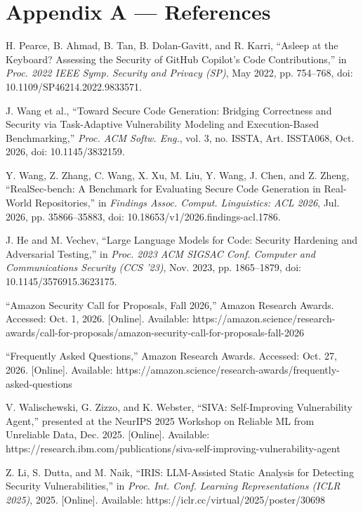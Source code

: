 \documentclass[11pt]{article}
\begin{document}
\section*{Appendix A --- References}
\begin{enumerate}[leftmargin=2.2em, itemsep=0.3ex, topsep=2pt, label={[\arabic*]}]
\item H. Pearce, B. Ahmad, B. Tan, B. Dolan-Gavitt, and R. Karri, ``Asleep at the Keyboard? Assessing the Security of GitHub Copilot's Code Contributions,'' in \emph{Proc. 2022 IEEE Symp. Security and Privacy (SP)}, May 2022, pp. 754--768, doi: 10.1109/SP46214.2022.9833571.
\item J. Wang et al., ``Toward Secure Code Generation: Bridging Correctness and Security via Task-Adaptive Vulnerability Modeling and Execution-Based Benchmarking,'' \emph{Proc. ACM Softw. Eng.}, vol. 3, no. ISSTA, Art. ISSTA068, Oct. 2026, doi: 10.1145/3832159.
\item Y. Wang, Z. Zhang, C. Wang, X. Xu, M. Liu, Y. Wang, J. Chen, and Z. Zheng, ``RealSec-bench: A Benchmark for Evaluating Secure Code Generation in Real-World Repositories,'' in \emph{Findings Assoc. Comput. Linguistics: ACL 2026}, Jul. 2026, pp. 35866--35883, doi: 10.18653/v1/2026.findings-acl.1786.
\item J. He and M. Vechev, ``Large Language Models for Code: Security Hardening and Adversarial Testing,'' in \emph{Proc. 2023 ACM SIGSAC Conf. Computer and Communications Security (CCS '23)}, Nov. 2023, pp. 1865--1879, doi: 10.1145/3576915.3623175.
\item ``Amazon Security Call for Proposals, Fall 2026,'' Amazon Research Awards. Accessed: Oct. 1, 2026. [Online]. Available: https://amazon.science/research-awards/call-for-proposals/amazon-security-call-for-proposals-fall-2026
\item ``Frequently Asked Questions,'' Amazon Research Awards. Accessed: Oct. 27, 2026. [Online]. Available: https://amazon.science/research-awards/frequently-asked-questions
\item V. Walischewski, G. Zizzo, and K. Webster, ``SIVA: Self-Improving Vulnerability Agent,'' presented at the NeurIPS 2025 Workshop on Reliable ML from Unreliable Data, Dec. 2025. [Online]. Available: https://research.ibm.com/publications/siva-self-improving-vulnerability-agent
\item Z. Li, S. Dutta, and M. Naik, ``IRIS: LLM-Assisted Static Analysis for Detecting Security Vulnerabilities,'' in \emph{Proc. Int. Conf. Learning Representations (ICLR 2025)}, 2025. [Online]. Available: https://iclr.cc/virtual/2025/poster/30698

\end{enumerate}
\end{document}
